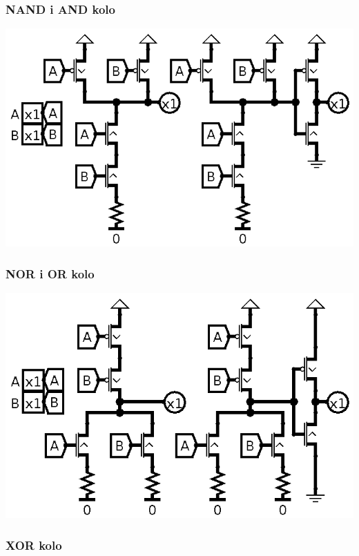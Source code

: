 \documentclass[12p,a4paper]{article}
\begin{document}
\begin{multicols}{2}
    \subsubsection{NAND i AND kolo}

    \includegraphics[width=0.8\columnwidth]{Figures/mos_nand_and.png}

    \subsubsection{NOR i OR kolo}

    \includegraphics[width=0.8\columnwidth]{Figures/mos_nor_or.png}

    \subsubsection{XOR kolo}


\end{multicols}
\end{document}
